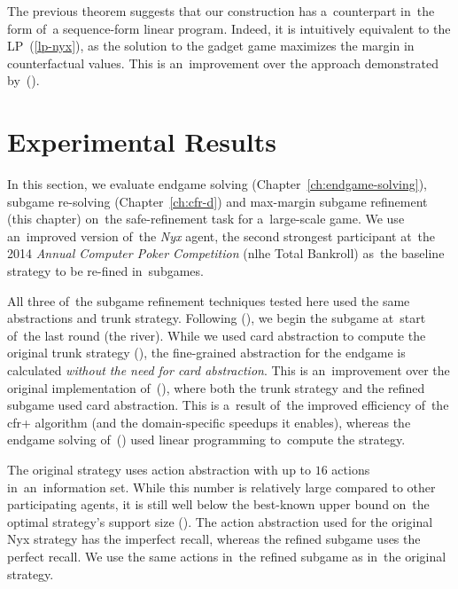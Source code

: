 The previous theorem suggests that our construction has a~counterpart in~the form of~a sequence-form linear program.
Indeed, it is intuitively equivalent to the LP~(\ref{lp-nyx}), as the solution to the gadget game maximizes the margin in counterfactual values.
This is an~improvement over the approach demonstrated by~(\cite{BurchJohansonBowling2014}).

\section{Experimental Results}
\label{sec:max-margin-experiments}
In this section, we evaluate endgame solving (Chapter~\ref{ch:endgame-solving}), subgame re-solving (Chapter~\ref{ch:cfr-d}) and max-margin subgame refinement (this chapter) on~the safe-refinement task for a~large-scale game.
We use an~improved version of~the \emph{Nyx} agent, the second strongest participant at~the 2014 \emph{Annual Computer Poker Competition} (\acrlong{nlhe} Total Bankroll)\footnotemark{} as~the baseline strategy to be re-fined in~subgames.

All three of~the subgame refinement techniques tested here used the same abstractions and trunk strategy.
Following (\cite{Ganzfried2015endgame}), we begin the subgame at~start of~the last round (the river).
While we used card abstraction to compute the original trunk strategy (\cite{Schmid2015automatic, Johanson2013evaluating}), the fine-grained abstraction for the endgame is calculated \emph{without the need for card abstraction}.
This is an~improvement over the original implementation of~(\cite{Ganzfried2015endgame}), where both the trunk strategy and the refined subgame used card abstraction.
This is a~result of~the improved efficiency of~the \acrshort{cfr}+ algorithm (and the domain-specific speedups it enables), whereas the endgame solving of~(\cite{Ganzfried2015endgame}) used linear programming to~compute the strategy.

The original strategy uses action abstraction with up to $16$ actions in~an~information set.
While this number is relatively large compared to other participating agents, it is still well below the best-known upper bound on~the optimal strategy's  support size (\cite{Schmid2014bounding}).
The action abstraction used for the original Nyx strategy has the imperfect recall, whereas the refined subgame uses the perfect recall.
We use the same actions in~the refined subgame as in~the original strategy.

